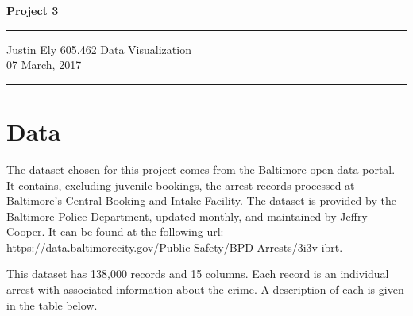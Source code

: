 \documentclass[a4paper,11pt]{article}
\begin{document}
\begin{flushright}

\vspace{1.1cm}

{\bf\Huge Project 3}

\rule{0.25\linewidth}{0.5pt}

\vspace{0.5cm}
Justin Ely
\linebreak
\newline
\footnotesize{605.462 Data Visualization \\}
\vspace{0.5cm}
07 March, 2017
\end{flushright}

\noindent\rule{\linewidth}{1.0pt}


\section{Data}
The dataset chosen for this project comes from the Baltimore open data portal.  It contains, excluding juvenile bookings, the arrest records processed at Baltimore's Central Booking and Intake Facility.  The dataset is provided by the Baltimore Police Department, updated monthly, and maintained by Jeffry Cooper.  It can be found at the following url: https://data.baltimorecity.gov/Public-Safety/BPD-Arrests/3i3v-ibrt.

This dataset has 138,000 records and 15 columns.  Each record is an individual arrest with associated information about the crime.  A description of each is given in the table below.
\end{document}

